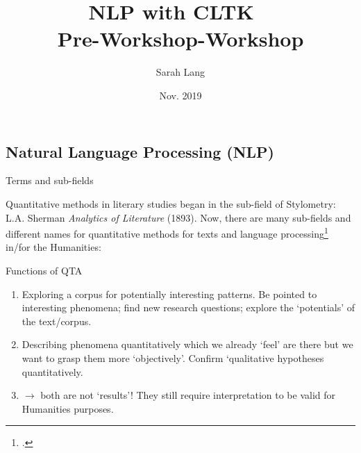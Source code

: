 \documentclass[10pt,a4paper]{article}
\title{\color{w3schools}NLP {\color{alert} with CLTK} \faFileTextO~ \\ {\color{black} Pre-Workshop-Workshop}}
\author{Sarah Lang}
\date{Nov. 2019}
\begin{document}
\small
\begin{multicols}{3}

\maketitle
\thispagestyle{empty}
\scriptsize
\tableofcontents


\section{Natural Language Processing (NLP)}


\begin{textbox}{Terms and sub-fields}

Quantitative methods in literary studies began in the sub-field of Stylometry: 
L.A. Sherman \emph{Analytics of Literature} (1893).  Now, there are many sub-fields and different names for quantitative methods for texts and language processing\footcite[\scriptsize A fascinating introductory read on the `statistical language model', underlying computerized language processing, is][\scriptsize Don't be put off by the emphasis on mathematics, it's really a series of easy-to-understand blog posts about langauge processing.]{beautyOfMathematics} in/for the Humanities:

 



\end{textbox}

\begin{textbox}{Functions of QTA}
\begin{enumerate}
    \item {} Exploring a corpus for potentially interesting patterns. Be pointed to interesting phenomena; find new research questions; explore the `potentials' of the text/corpus.
    \item {} Describing phenomena quantitatively which we already `feel' are there but we want to grasp them more `objectively'. Confirm `qualitative hypotheses quantitatively.
    \item $\to$ both are not `results'! They still require interpretation to be valid for Humanities purposes.
\end{enumerate}


\end{textbox}
\end{multicols}
\end{document}
